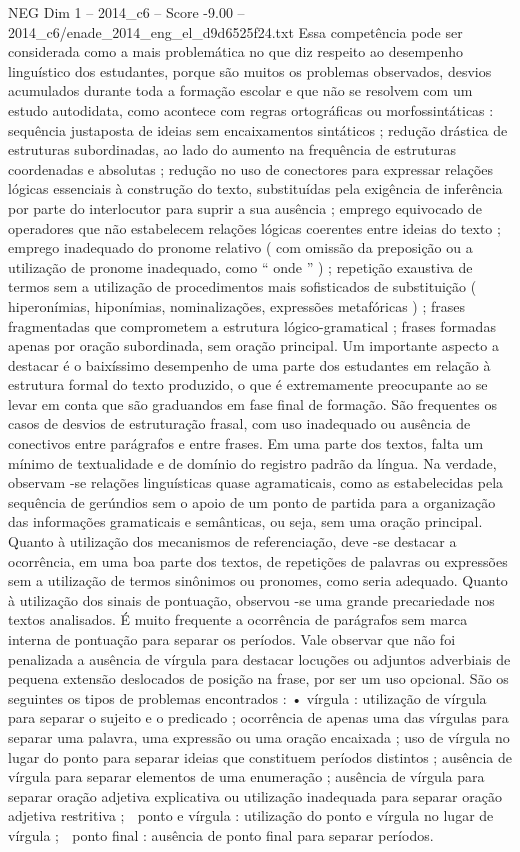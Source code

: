 \begin{textsample}{NEG Dim 1 – 2014\_c6 – Score -9.00 – 2014\_c6/enade\_2014\_eng\_el\_d9d6525f24.txt}
Essa competência pode ser considerada como a mais problemática no que diz respeito ao desempenho linguístico dos estudantes, porque são muitos os problemas observados, desvios acumulados durante toda a formação escolar e que não se resolvem com um estudo autodidata, como acontece com regras ortográficas ou morfossintáticas : sequência justaposta de ideias sem encaixamentos sintáticos ; redução drástica de estruturas subordinadas, ao lado do aumento na frequência de estruturas coordenadas e absolutas ; redução no uso de conectores para expressar relações lógicas essenciais à construção do texto, substituídas pela exigência de inferência por parte do interlocutor para suprir a sua ausência ; emprego equivocado de operadores que não estabelecem relações lógicas coerentes entre ideias do texto ; emprego inadequado do pronome relativo ( com omissão da preposição ou a utilização de pronome inadequado, como “ onde ” ) ; repetição exaustiva de termos sem a utilização de procedimentos mais sofisticados de substituição ( hiperonímias, hiponímias, nominalizações, expressões metafóricas ) ; frases fragmentadas que comprometem a estrutura lógico-gramatical ; frases formadas apenas por oração subordinada, sem oração principal.
Um importante aspecto a destacar é o baixíssimo desempenho de uma parte dos estudantes em relação à estrutura formal do texto produzido, o que é extremamente preocupante ao se levar em conta que são graduandos em fase final de formação.
São frequentes os casos de desvios de estruturação frasal, com uso inadequado ou ausência de conectivos entre parágrafos e entre frases.
Em uma parte dos textos, falta um mínimo de textualidade e de domínio do registro padrão da língua.
Na verdade, observam -se relações linguísticas quase agramaticais, como as estabelecidas pela sequência de gerúndios sem o apoio de um ponto de partida para a organização das informações gramaticais e semânticas, ou seja, sem uma oração principal.
Quanto à utilização dos mecanismos de referenciação, deve -se destacar a ocorrência, em uma boa parte dos textos, de repetições de palavras ou expressões sem a utilização de termos sinônimos ou pronomes, como seria adequado.
Quanto à utilização dos sinais de pontuação, observou -se uma grande precariedade nos textos analisados.
É muito frequente a ocorrência de parágrafos sem marca interna de pontuação para separar os períodos.
Vale observar que não foi penalizada a ausência de vírgula para destacar locuções ou adjuntos adverbiais de pequena extensão deslocados de posição na frase, por ser um uso opcional.
São os seguintes os tipos de problemas encontrados : • vírgula : utilização de vírgula para separar o sujeito e o predicado ; ocorrência de apenas uma das vírgulas para separar uma palavra, uma expressão ou uma oração encaixada ; uso de vírgula no lugar do ponto para separar ideias que constituem períodos distintos ; ausência de vírgula para separar elementos de uma enumeração ; ausência de vírgula para separar oração adjetiva explicativa ou utilização inadequada para separar oração adjetiva restritiva ;  ponto e vírgula : utilização do ponto e vírgula no lugar de vírgula ;  ponto final : ausência de ponto final para separar períodos.

\end{textsample}
